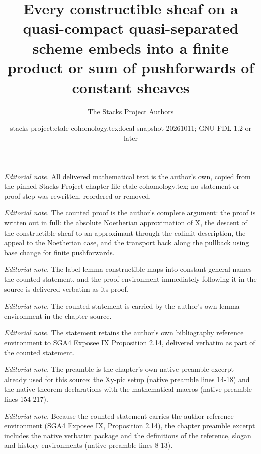 \documentclass[10pt,a4paper]{amsart}
\title{Every constructible sheaf on a quasi-compact quasi-separated scheme embeds into a finite product or sum of pushforwards of constant sheaves}
\author{The Stacks Project Authors}
\date{stacks-project:etale-cohomology.tex:local-snapshot-20261011; GNU FDL 1.2 or later}
\theoremstyle{plain}
\theoremstyle{definition}
\theoremstyle{remark}
\numberwithin{equation}{subsection}
\begin{document}
\maketitle
\noindent\textit{Editorial note.} All delivered mathematical text is the author's own, copied from the pinned Stacks Project chapter file etale-cohomology.tex; no statement or proof step was rewritten, reordered or removed.\par\medskip
\noindent\textit{Editorial note.} The counted proof is the author's complete argument: the proof is written out in full: the absolute Noetherian approximation of X, the descent of the constructible sheaf to an approximant through the colimit description, the appeal to the Noetherian case, and the transport back along the pullback using base change for finite pushforwards.\par\medskip
\noindent\textit{Editorial note.} The label lemma-constructible-maps-into-constant-general names the counted statement, and the proof environment immediately following it in the source is delivered verbatim as its proof.\par\medskip
\noindent\textit{Editorial note.} The counted statement is carried by the author's own lemma environment in the chapter source.\par\medskip
\noindent\textit{Editorial note.} The statement retains the author's own bibliography reference environment to SGA4 Exposee IX Proposition 2.14, delivered verbatim as part of the counted statement.\par\medskip
\noindent\textit{Editorial note.} The preamble is the chapter's own native preamble excerpt already used for this source: the Xy-pic setup (native preamble lines 14-18) and the native theorem declarations with the mathematical macros (native preamble lines 154-217).\par\medskip
\noindent\textit{Editorial note.} Because the counted statement carries the author reference environment (SGA4 Exposee IX, Proposition 2.14), the chapter preamble excerpt includes the native verbatim package and the definitions of the reference, slogan and history environments (native preamble lines 8-13).\par\medskip
\end{document}
